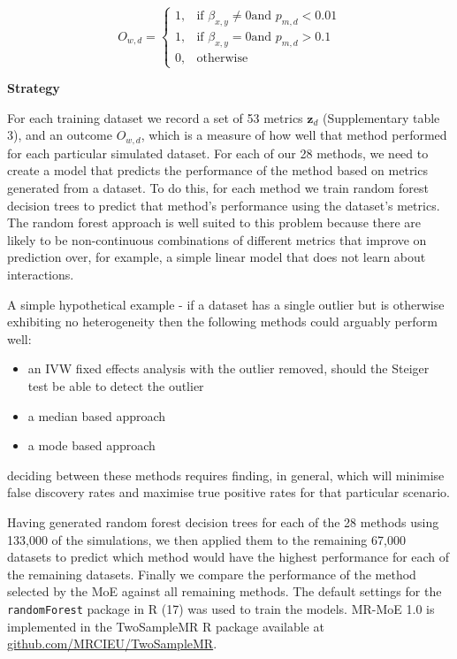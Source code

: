 \documentclass[]{article}
\providecommand{\tightlist}{%
  \setlength{\itemsep}{0pt}\setlength{\parskip}{0pt}}
\begin{document}
\[
    O_{w,d} = 
\begin{cases}
    1,   & \text{if } \beta_{x,y} \neq 0 \text{and } p_{m,d} < 0.01\\
    1,   & \text{if } \beta_{x,y} = 0 \text{and } p_{m,d} > 0.1 \\
    0,   & \text{otherwise}
\end{cases}
\]

\textbf{Strategy}

For each training dataset we record a set of 53 metrics
\(\textbf{z}_{d}\) (Supplementary table 3), and an outcome \(O_{w,d}\),
which is a measure of how well that method performed for each particular
simulated dataset. For each of our 28 methods, we need to create a model
that predicts the performance of the method based on metrics generated
from a dataset. To do this, for each method we train random forest
decision trees to predict that method's performance using the dataset's
metrics. The random forest approach is well suited to this problem
because there are likely to be non-continuous combinations of different
metrics that improve on prediction over, for example, a simple linear
model that does not learn about interactions.

A simple hypothetical example - if a dataset has a single outlier but is
otherwise exhibiting no heterogeneity then the following methods could
arguably perform well:

\begin{itemize}
\tightlist
\item
  an IVW fixed effects analysis with the outlier removed, should the
  Steiger test be able to detect the outlier
\item
  a median based approach
\item
  a mode based approach
\end{itemize}

deciding between these methods requires finding, in general, which will
minimise false discovery rates and maximise true positive rates for that
particular scenario.

Having generated random forest decision trees for each of the 28 methods
using 133,000 of the simulations, we then applied them to the remaining
67,000 datasets to predict which method would have the highest
performance for each of the remaining datasets. Finally we compare the
performance of the method selected by the MoE against all remaining
methods. The default settings for the \texttt{randomForest} package in R
(17) was used to train the models. MR-MoE 1.0 is implemented in the
TwoSampleMR R package available at
\href{https://github.com/MRCIEU/TwoSampleMR}{github.com/MRCIEU/TwoSampleMR}.
\end{document}
